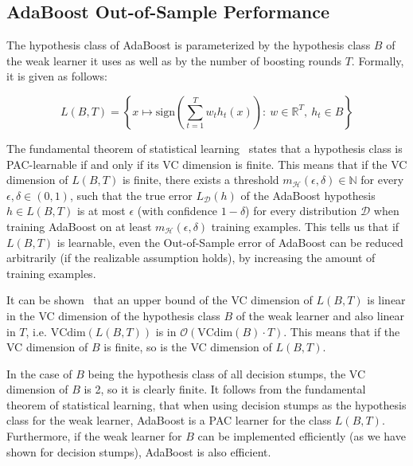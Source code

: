 \subsection{AdaBoost Out-of-Sample Performance}

The hypothesis class of AdaBoost is parameterized by the hypothesis class $B$ of the weak learner it uses as well as by
the number of boosting rounds $T$. Formally, it is given as follows:
\begin{linenomath*}
    $$
    L(B, T) = \left \{ x \mapsto \text{sign} \left( \sum_{t=1}^T w_t h_t(x) \right): \ 
        w \in \mathbb{R}^T, \  h_t \in B \right \}
    $$
\end{linenomath*}

The fundamental theorem of statistical learning~\cite[chapter 6]{SSBD14} states that a hypothesis class is PAC-learnable
if and only if its VC dimension is finite.
This means that if the VC dimension of $L(B, T)$ is finite, there exists a threshold 
$m_\mathcal{H}(\epsilon, \delta) \in \mathbb{N}$ for every $\epsilon, \delta \in (0, 1)$, 
such that the true error $L_\mathcal{D}(h)$ of the AdaBoost hypothesis $h \in L(B, T)$ is at most $\epsilon$
(with confidence $1-\delta$)
for every distribution $\mathcal{D}$ when training AdaBoost on at least $m_\mathcal{H}(\epsilon, \delta)$ training
examples. This tells us that if $L(B, T)$ is learnable, even the Out-of-Sample error of AdaBoost can be reduced
arbitrarily (if the realizable assumption holds), by increasing the amount of training examples.

It can be shown~\cite{SSBD14} that an upper bound of the VC dimension of $L(B, T)$ 
is linear in the VC dimension of the hypothesis
class $B$ of the weak learner and also linear in $T$, i.e. $\text{VCdim}(L(B, T))$ is in
$\mathcal{O}(\text{VCdim}(B) \cdot T)$.
This means that if the VC dimension of $B$ is finite, so is the VC dimension of $L(B, T)$.

In the case of $B$ being the hypothesis class of all decision stumps, the VC dimension of $B$ is 2,
so it is clearly finite.
It follows from the fundamental theorem of statistical learning, that when using decision stumps as the hypothesis
class for the weak learner, AdaBoost is a PAC learner for the class $L(B, T)$.
Furthermore, if the weak learner for $B$ can be implemented efficiently (as we have shown for decision stumps), AdaBoost
is also efficient.
